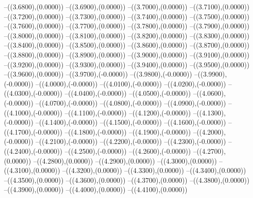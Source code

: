 {	--({\sx*(3.6800)},{\sy*(0.0000)})
	--({\sx*(3.6900)},{\sy*(0.0000)})
	--({\sx*(3.7000)},{\sy*(0.0000)})
	--({\sx*(3.7100)},{\sy*(0.0000)})
	--({\sx*(3.7200)},{\sy*(0.0000)})
	--({\sx*(3.7300)},{\sy*(0.0000)})
	--({\sx*(3.7400)},{\sy*(0.0000)})
	--({\sx*(3.7500)},{\sy*(0.0000)})
	--({\sx*(3.7600)},{\sy*(0.0000)})
	--({\sx*(3.7700)},{\sy*(0.0000)})
	--({\sx*(3.7800)},{\sy*(0.0000)})
	--({\sx*(3.7900)},{\sy*(0.0000)})
	--({\sx*(3.8000)},{\sy*(0.0000)})
	--({\sx*(3.8100)},{\sy*(0.0000)})
	--({\sx*(3.8200)},{\sy*(0.0000)})
	--({\sx*(3.8300)},{\sy*(0.0000)})
	--({\sx*(3.8400)},{\sy*(0.0000)})
	--({\sx*(3.8500)},{\sy*(0.0000)})
	--({\sx*(3.8600)},{\sy*(0.0000)})
	--({\sx*(3.8700)},{\sy*(0.0000)})
	--({\sx*(3.8800)},{\sy*(0.0000)})
	--({\sx*(3.8900)},{\sy*(0.0000)})
	--({\sx*(3.9000)},{\sy*(0.0000)})
	--({\sx*(3.9100)},{\sy*(0.0000)})
	--({\sx*(3.9200)},{\sy*(0.0000)})
	--({\sx*(3.9300)},{\sy*(0.0000)})
	--({\sx*(3.9400)},{\sy*(0.0000)})
	--({\sx*(3.9500)},{\sy*(0.0000)})
	--({\sx*(3.9600)},{\sy*(0.0000)})
	--({\sx*(3.9700)},{\sy*(-0.0000)})
	--({\sx*(3.9800)},{\sy*(-0.0000)})
	--({\sx*(3.9900)},{\sy*(-0.0000)})
	--({\sx*(4.0000)},{\sy*(-0.0000)})
	--({\sx*(4.0100)},{\sy*(-0.0000)})
	--({\sx*(4.0200)},{\sy*(-0.0000)})
	--({\sx*(4.0300)},{\sy*(-0.0000)})
	--({\sx*(4.0400)},{\sy*(-0.0000)})
	--({\sx*(4.0500)},{\sy*(-0.0000)})
	--({\sx*(4.0600)},{\sy*(-0.0000)})
	--({\sx*(4.0700)},{\sy*(-0.0000)})
	--({\sx*(4.0800)},{\sy*(-0.0000)})
	--({\sx*(4.0900)},{\sy*(-0.0000)})
	--({\sx*(4.1000)},{\sy*(-0.0000)})
	--({\sx*(4.1100)},{\sy*(-0.0000)})
	--({\sx*(4.1200)},{\sy*(-0.0000)})
	--({\sx*(4.1300)},{\sy*(-0.0000)})
	--({\sx*(4.1400)},{\sy*(-0.0000)})
	--({\sx*(4.1500)},{\sy*(-0.0000)})
	--({\sx*(4.1600)},{\sy*(-0.0000)})
	--({\sx*(4.1700)},{\sy*(-0.0000)})
	--({\sx*(4.1800)},{\sy*(-0.0000)})
	--({\sx*(4.1900)},{\sy*(-0.0000)})
	--({\sx*(4.2000)},{\sy*(-0.0000)})
	--({\sx*(4.2100)},{\sy*(-0.0000)})
	--({\sx*(4.2200)},{\sy*(-0.0000)})
	--({\sx*(4.2300)},{\sy*(-0.0000)})
	--({\sx*(4.2400)},{\sy*(-0.0000)})
	--({\sx*(4.2500)},{\sy*(-0.0000)})
	--({\sx*(4.2600)},{\sy*(-0.0000)})
	--({\sx*(4.2700)},{\sy*(0.0000)})
	--({\sx*(4.2800)},{\sy*(0.0000)})
	--({\sx*(4.2900)},{\sy*(0.0000)})
	--({\sx*(4.3000)},{\sy*(0.0000)})
	--({\sx*(4.3100)},{\sy*(0.0000)})
	--({\sx*(4.3200)},{\sy*(0.0000)})
	--({\sx*(4.3300)},{\sy*(0.0000)})
	--({\sx*(4.3400)},{\sy*(0.0000)})
	--({\sx*(4.3500)},{\sy*(0.0000)})
	--({\sx*(4.3600)},{\sy*(0.0000)})
	--({\sx*(4.3700)},{\sy*(0.0000)})
	--({\sx*(4.3800)},{\sy*(0.0000)})
	--({\sx*(4.3900)},{\sy*(0.0000)})
	--({\sx*(4.4000)},{\sy*(0.0000)})
	--({\sx*(4.4100)},{\sy*(0.0000)})
}
